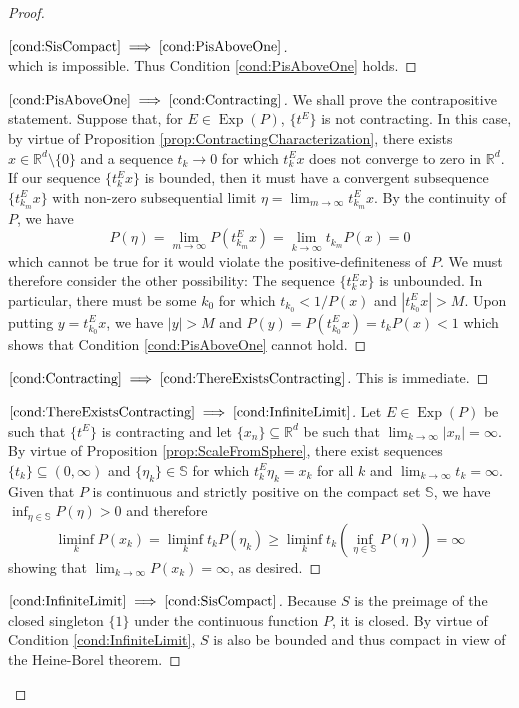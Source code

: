 \documentclass[11pt]{article}
\theoremstyle{theorem}
\newcommand*{\myproofname}{Proof}
\newenvironment{subproof}[1][\myproofname]{\begin{proof}[#1]\renewcommand*{\qedsymbol}{$\mathbin{/\mkern-6mu/}$}}{\end{proof}}
\newcommand\Exp{\operatorname{Exp}}
\begin{document}
\begin{proof}
\begin{subproof}[$\ref{cond:SisCompact}\implies\ref{cond:PisAboveOne}$]
\begin{equation*}
\end{equation*}
which is impossible. Thus Condition \ref{cond:PisAboveOne} holds.
\end{subproof}
\begin{subproof}[$\ref{cond:PisAboveOne}\implies\ref{cond:Contracting}$]
We shall prove the contrapositive statement. Suppose that, for $E\in\Exp(P)$, $\{t^E\}$ is not contracting. In this case, by virtue of Proposition \ref{prop:ContractingCharacterization}, there exists $x\in\mathbb{R}^d\setminus\{0\}$ and a sequence $t_k\to 0$ for which $t_k^Ex$ does not converge to zero in $\mathbb{R}^d$. If our sequence $\{t_k^Ex\}$ is bounded, then it must have a convergent subsequence $\{t_{k_m}^Ex\}$ with non-zero subsequential limit $\eta=\lim_{m\to\infty}t_{k_m}^Ex$. By the continuity of $P$, we have
\begin{equation*}
P(\eta)=\lim_{m\to\infty}P(t_{k_m}^Ex)=\lim_{k\to\infty}t_{k_m}P(x)=0
\end{equation*}
which cannot be true for it would violate the positive-definiteness of $P$. We must therefore consider the other possibility: The sequence $\{t_k^Ex\}$ is unbounded. In particular, there must be some $k_0$ for which $t_{k_0}<1/P(x)$ and $|t_{k_0}^Ex|>M$. Upon putting $y=t_{k_0}^Ex$, we have $|y|>M$ and  $P(y)=P(t_{k_0}^Ex)=t_kP(x)<1$ which shows that Condition \ref{cond:PisAboveOne} cannot hold.
\end{subproof}
\begin{subproof}[$\ref{cond:Contracting}\implies\ref{cond:ThereExistsContracting}$] This is immediate.
\end{subproof}
\begin{subproof}[$\ref{cond:ThereExistsContracting}\implies\ref{cond:InfiniteLimit}$]
Let $E\in\Exp(P)$ be such that $\{t^E\}$ is contracting and let $\{x_n\}\subseteq\mathbb{R}^d$ be such that $\lim_{k\to\infty}|x_n|=\infty$. By virtue of Proposition \ref{prop:ScaleFromSphere}, there exist sequences $\{t_k\}\subseteq (0,\infty)$ and $\{\eta_k\}\in\mathbb{S}$ for which $t_k^E\eta_k=x_k$ for all $k$ and $\lim_{k\to\infty}t_k=\infty$. Given that $P$ is continuous and strictly positive on the compact set $\mathbb{S}$, we have $\inf_{\eta\in\mathbb{S}}P(\eta)>0$ and therefore
\begin{equation*}
\liminf_k P(x_k)=\liminf_k t_kP(\eta_k)\geq \liminf_k t_k\left(\inf_{\eta\in\mathbb{S}}P(\eta)\right)=\infty
\end{equation*}
showing that $\lim_{k\to\infty} P(x_k)=\infty$, as desired.
\end{subproof}
\begin{subproof}[$\ref{cond:InfiniteLimit}\implies\ref{cond:SisCompact}$]
Because $S$ is the preimage of the closed singleton $\{1\}$ under the continuous function $P$, it is closed. By virtue of Condition \ref{cond:InfiniteLimit}, $S$ is also be bounded and thus compact in view of the Heine-Borel theorem.
\end{subproof}
\end{proof}
\end{document}
